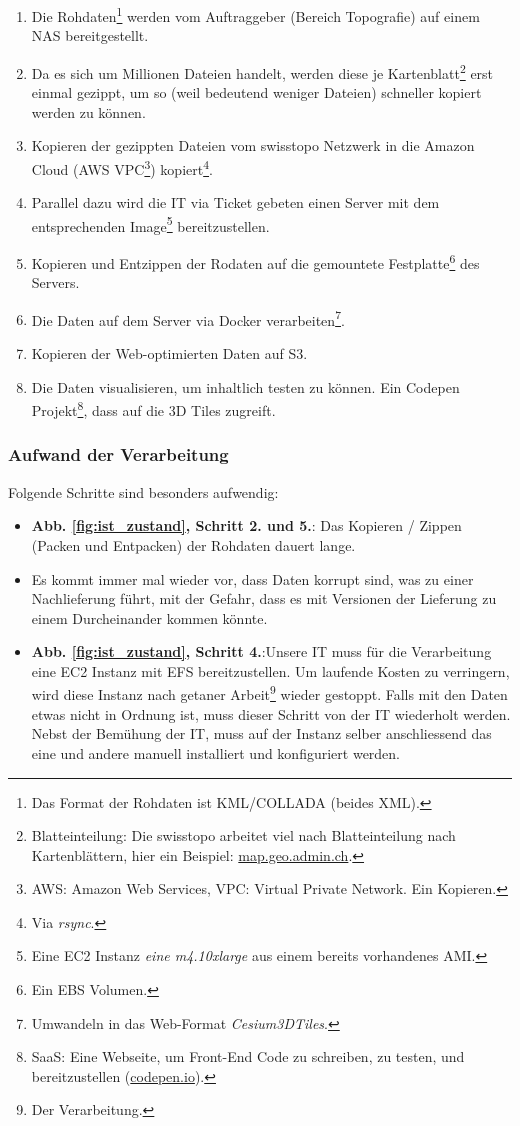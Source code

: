 \begin{enumerate}
\item Die Rohdaten\footnote{Das Format der Rohdaten ist KML/COLLADA (beides XML).} werden vom Auftraggeber (Bereich Topografie) auf einem NAS bereitgestellt.
\item Da es sich um Millionen Dateien handelt, werden diese je Kartenblatt\footnote{Blatteinteilung: Die swisstopo arbeitet viel nach Blatteinteilung nach Kartenblättern, hier ein Beispiel: \href{https://s.geo.admin.ch/8b5f3f6721}{map.geo.admin.ch}.} erst einmal gezippt, um so (weil bedeutend weniger Dateien) schneller kopiert werden zu können.
\item Kopieren der gezippten Dateien vom swisstopo Netzwerk in die Amazon Cloud (AWS VPC\footnote{AWS: Amazon Web Services, VPC: Virtual Private Network. Ein Kopieren.}) kopiert\footnote{Via \emph{rsync}.}.
\item Parallel dazu wird die IT via Ticket gebeten einen Server mit dem entsprechenden Image\footnote{Eine EC2 Instanz \emph{eine m4.10xlarge} aus einem bereits vorhandenes AMI.} bereitzustellen.
\item Kopieren und Entzippen der Rodaten auf die gemountete Festplatte\footnote{Ein EBS Volumen.} des Servers.
\item Die Daten auf dem Server via Docker verarbeiten\footnote{Umwandeln in das Web-Format \emph{Cesium3DTiles}.}.
\item Kopieren der Web-optimierten Daten auf S3.
\item Die Daten visualisieren, um inhaltlich testen zu können. Ein Codepen Projekt\footnote{SaaS: Eine Webseite, um Front-End Code zu schreiben, zu testen, und bereitzustellen (\href{https://codepen.io}{codepen.io}).}, dass auf die 3D Tiles zugreift.
\end{enumerate}

\subsubsection{Aufwand der Verarbeitung}
\label{aufwand_prozessierung}
Folgende Schritte sind besonders aufwendig:
\begin{itemize}
\item \textbf{Abb. \ref{fig:ist_zustand}, Schritt 2. und 5.}: Das Kopieren / Zippen (Packen und Entpacken) der Rohdaten dauert lange.
\item Es kommt immer mal wieder vor, dass Daten korrupt sind, was zu einer Nachlieferung führt, mit der Gefahr, dass es mit Versionen der Lieferung zu einem Durcheinander kommen könnte.
\item \textbf{Abb. \ref{fig:ist_zustand}, Schritt 4.}:Unsere IT muss für die Verarbeitung eine EC2 Instanz mit EFS bereitzustellen. Um laufende Kosten zu verringern, wird diese Instanz nach getaner Arbeit\footnote{Der Verarbeitung.} wieder gestoppt. Falls mit den Daten etwas nicht in Ordnung ist, muss dieser Schritt von der IT wiederholt werden. Nebst der Bemühung der IT, muss auf der Instanz selber anschliessend das eine und andere manuell installiert und konfiguriert werden.
\end{itemize}

